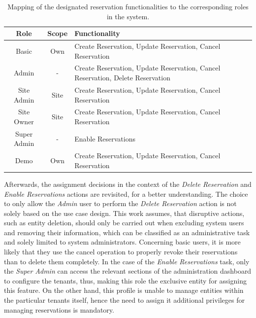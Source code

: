 \begingroup
\setlength{\tabcolsep}{10pt} %
\renewcommand{\arraystretch}{1.5} %
\begin{table}[h]
    \centering
    \caption{Mapping of the designated reservation functionalities to the corresponding roles in the system.}
    \begin{tabular}{c|c|m{9.5cm}}
        Role & Scope & Functionality \\
        \hline
        Basic & Own & Create Reservation, Update Reservation, Cancel Reservation \\
        Admin & - & Create Reservation, Update Reservation, Cancel Reservation, Delete Reservation \\
        Site Admin & Site & Create Reservation, Update Reservation, Cancel Reservation \\
        Site Owner & Site & Create Reservation, Update Reservation, Cancel Reservation \\
        Super Admin & - & Enable Reservations \\
        Demo & Own & Create Reservation, Update Reservation, Cancel Reservation \\
    \end{tabular}
    \label{tab:role-function-mapping}
\end{table}
\endgroup

\noindent Afterwards, the assignment decisions in the context of the \textit{Delete Reservation} and \textit{Enable Reservations} actions are revisited, for a better understanding. The choice to only allow the \textit{Admin} user to perform the \textit{Delete Reservation} action is not solely based on the use case design.
This work assumes, that disruptive actions, such as entity deletion, should only be carried out when excluding system users and removing their information, which can be classified as an administrative task and solely limited to system administrators.
Concerning basic users, it is more likely that they use the cancel operation to properly revoke their reservations than to delete them completely.
In the case of the \textit{Enable Reservations} task, only the \textit{Super Admin} can access the relevant sections of the administration dashboard to configure the tenants, thus, making this role the exclusive entity for assigning this feature. 
On the other hand, this profile is unable to manage entities within the particular tenants itself, hence the need to assign it additional privileges for managing reservations is mandatory. 

